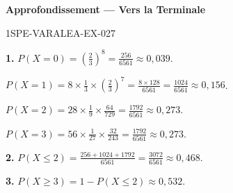 \begin{center}\textbf{Approfondissement — Vers la Terminale}\end{center}
\begin{corrige}{1SPE-VARALEA-EX-027}

\textbf{1.} $P(X=0) = \left(\frac{2}{3}\right)^8 = \frac{256}{6561} \approx 0{,}039$.

$P(X=1) = 8 \times \frac{1}{3} \times \left(\frac{2}{3}\right)^7 = \frac{8 \times 128}{6561} = \frac{1024}{6561} \approx 0{,}156$.

$P(X=2) = 28 \times \frac{1}{9} \times \frac{64}{729} = \frac{1792}{6561} \approx 0{,}273$.

$P(X=3) = 56 \times \frac{1}{27} \times \frac{32}{243} = \frac{1792}{6561} \approx 0{,}273$.

\medskip
\textbf{2.} $P(X \leq 2) = \frac{256+1024+1792}{6561} = \frac{3072}{6561} \approx 0{,}468$.

\medskip
\textbf{3.} $P(X \geq 3) = 1 - P(X \leq 2) \approx 0{,}532$.

\end{corrige}
